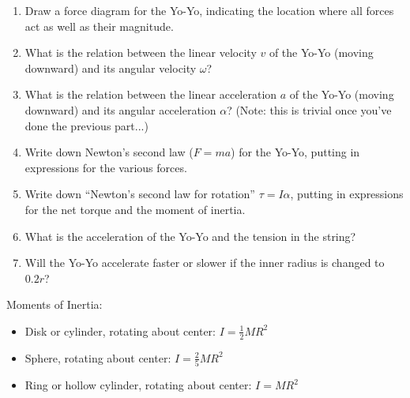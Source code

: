 \documentclass[12pt]{article}
\begin{document}
\begin{enumerate}
\begin{enumerate}
     	       \item{Draw a force diagram for the Yo-Yo, indicating the location where all forces act as well as their magnitude.}
     	
     	\vspace{4in}
     	
       \item{What is the relation between the linear velocity $v$ of the Yo-Yo (moving downward) and its angular velocity $\omega$?}

\vspace{1in}
       \item{What is the relation between the linear acceleration $a$ of the Yo-Yo (moving downward) and its angular acceleration $\alpha$? (Note: this is trivial once you've done the previous part...)}

\vspace{1in}


\newpage
       \item{Write down Newton's second law ($F=ma$) for the Yo-Yo, putting in expressions for the various forces.}

\vspace{2in}

       \item{Write down ``Newton's second law for rotation'' $\tau = I \alpha$, putting in expressions for the net torque and the moment of inertia.}

\vspace{2in}
       \item{What is the acceleration of the Yo-Yo and the tension in the string?}

\vspace{2.5in}
       \item{Will the Yo-Yo accelerate faster or slower if the inner radius is changed to $0.2r$?}


     \end{enumerate}

\newpage
\centerline{}


Moments of Inertia:
\begin{itemize}
  \item{Disk or cylinder, rotating about center: $I = \frac{1}{2}MR^2$}
  \item{Sphere, rotating about center: $I = \frac{2}{5}MR^2$}
  \item{Ring or hollow cylinder, rotating about center: $I = MR^2$}
\end{itemize}


\end{enumerate}
\end{document}
